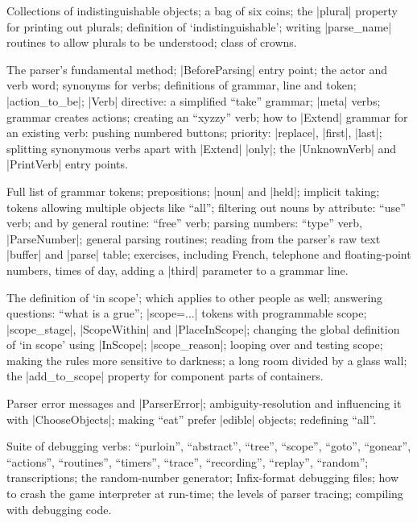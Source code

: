 %
Collections of indistinguishable objects; a bag of six coins; the |plural|
property for printing out plurals; definition of `indistinguishable';
writing |parse_name| routines to allow plurals to be understood; class of
crowns.

%
The parser's fundamental method; |BeforeParsing| entry point; the actor and
verb word; synonyms for verbs; definitions of grammar, line and token;
|action_to_be|; |Verb| directive: a simplified ``take'' grammar; |meta|
verbs; grammar creates actions; creating an ``xyzzy'' verb; how to |Extend|
grammar for an existing verb: pushing numbered buttons; priority: |replace|,
|first|, |last|; splitting synonymous verbs apart with |Extend| |only|; the
|UnknownVerb| and |PrintVerb| entry points.

%
Full list of grammar tokens; prepositions; |noun| and |held|; implicit
taking; tokens allowing multiple objects like ``all''; filtering out nouns
by attribute: ``use'' verb; and by general routine: ``free'' verb; parsing
numbers: ``type'' verb, |ParseNumber|; general parsing routines; reading
from the parser's raw text |buffer| and |parse| table; exercises, including
French, telephone and floating-point numbers, times of day, adding a
|third| parameter to a grammar line.

%
The definition of `in scope'; which applies to other people as well;
answering questions: ``what is a grue''; |scope=...| tokens with
programmable scope; |scope_stage|, |ScopeWithin| and |PlaceInScope|;
changing the global definition of `in scope' using |InScope|;
|scope_reason|; looping over and testing scope; making the rules more
sensitive to darkness; a long room divided by a glass wall; the
|add_to_scope| property for component parts of containers.

%
Parser error messages and |ParserError|; ambiguity-resolution and
influencing it with |ChooseObjects|; making ``eat'' prefer |edible|
objects; redefining ``all''.

\vfill\eject
{}

%
Suite of debugging verbs: ``purloin'', ``abstract'', ``tree'', ``scope'',
``goto'', ``gonear'', ``actions'', ``routines'', ``timers'', ``trace'',
``recording'', ``replay'', ``random''; transcriptions; the random-number
generator; Infix-format debugging files; how to crash the game interpreter
at run-time; the levels of parser tracing; compiling with debugging code.

